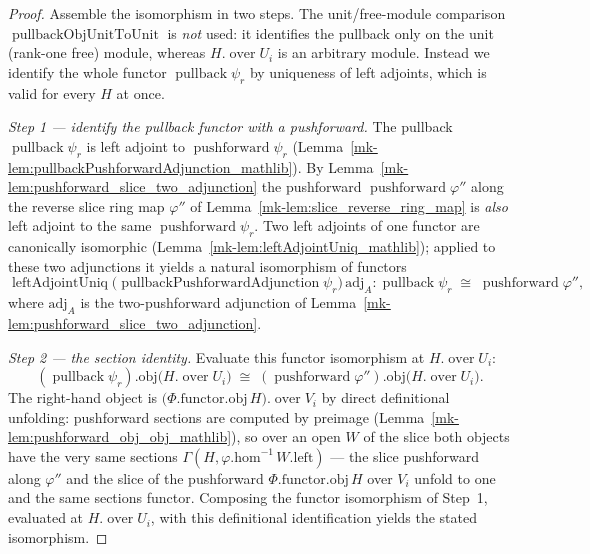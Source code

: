 \begin{proof}
  \leanok
    Assemble the isomorphism in two steps. The unit/free-module comparison
  \(\operatorname{pullbackObjUnitToUnit}\) is \emph{not} used: it identifies the pullback only on the
  unit (rank-one free) module, whereas \(H.\operatorname{over} U_i\) is an arbitrary module. Instead we
  identify the whole functor \(\operatorname{pullback}\psi_r\) by uniqueness of left adjoints, which is
  valid for every \(H\) at once.

  \emph{Step 1 --- identify the pullback functor with a pushforward.} The pullback
  \(\operatorname{pullback}\psi_r\) is left adjoint to \(\operatorname{pushforward}\psi_r\)
  (Lemma~\ref{mk-lem:pullbackPushforwardAdjunction_mathlib}). By
  Lemma~\ref{mk-lem:pushforward_slice_two_adjunction} the pushforward
  \(\operatorname{pushforward}\varphi''\) along the reverse slice ring map \(\varphi''\) of
  Lemma~\ref{mk-lem:slice_reverse_ring_map} is \emph{also} left adjoint to the same
  \(\operatorname{pushforward}\psi_r\). Two left adjoints of one functor are canonically isomorphic
  (Lemma~\ref{mk-lem:leftAdjointUniq_mathlib}); applied to these two adjunctions it yields a natural
  isomorphism of functors
  \[
    \operatorname{leftAdjointUniq}\bigl(\operatorname{pullbackPushforwardAdjunction}\psi_r\bigr)\,
      \mathrm{adj}_A : \operatorname{pullback}\psi_r \;\cong\; \operatorname{pushforward}\varphi'',
  \]
  where \(\mathrm{adj}_A\) is the two-pushforward adjunction of
  Lemma~\ref{mk-lem:pushforward_slice_two_adjunction}.

  \emph{Step 2 --- the section identity.} Evaluate this functor isomorphism at \(H.\operatorname{over}
  U_i\):
  \[
    (\operatorname{pullback}\psi_r).\mathrm{obj}\bigl(H.\operatorname{over} U_i\bigr) \;\cong\;
    (\operatorname{pushforward}\varphi'').\mathrm{obj}\bigl(H.\operatorname{over} U_i\bigr).
  \]
  The right-hand object is \(\bigl(\Phi.\mathrm{functor}.\mathrm{obj}\, H\bigr).\operatorname{over}
  V_i\) by direct definitional unfolding: pushforward sections are computed by
  preimage (Lemma~\ref{mk-lem:pushforward_obj_obj_mathlib}), so over an open \(W\) of the slice both
  objects have the very same sections \(\Gamma(H, \varphi.\mathrm{hom}^{-1}\, W.\mathrm{left})\) ---
  the slice pushforward along \(\varphi''\) and the slice of the pushforward
  \(\Phi.\mathrm{functor}.\mathrm{obj}\, H\) over \(V_i\) unfold to one and the same sections functor.
  Composing the functor isomorphism of Step~1, evaluated at \(H.\operatorname{over} U_i\), with this
  definitional identification yields the stated isomorphism.
\end{proof}

